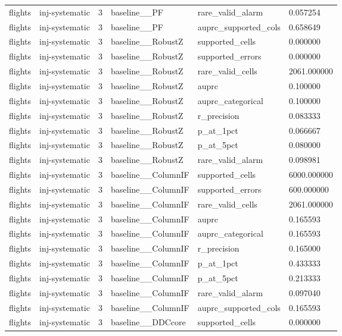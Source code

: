 \begin{tabular}{llllll}
flights & inj-systematic & 3 & baseline\_\_PF & rare\_valid\_alarm & 0.057254 \\
flights & inj-systematic & 3 & baseline\_\_PF & auprc\_supported\_cols & 0.658649 \\
flights & inj-systematic & 3 & baseline\_\_RobustZ & supported\_cells & 0.000000 \\
flights & inj-systematic & 3 & baseline\_\_RobustZ & supported\_errors & 0.000000 \\
flights & inj-systematic & 3 & baseline\_\_RobustZ & rare\_valid\_cells & 2061.000000 \\
flights & inj-systematic & 3 & baseline\_\_RobustZ & auprc & 0.100000 \\
flights & inj-systematic & 3 & baseline\_\_RobustZ & auprc\_categorical & 0.100000 \\
flights & inj-systematic & 3 & baseline\_\_RobustZ & r\_precision & 0.083333 \\
flights & inj-systematic & 3 & baseline\_\_RobustZ & p\_at\_1pct & 0.066667 \\
flights & inj-systematic & 3 & baseline\_\_RobustZ & p\_at\_5pct & 0.080000 \\
flights & inj-systematic & 3 & baseline\_\_RobustZ & rare\_valid\_alarm & 0.098981 \\
flights & inj-systematic & 3 & baseline\_\_ColumnIF & supported\_cells & 6000.000000 \\
flights & inj-systematic & 3 & baseline\_\_ColumnIF & supported\_errors & 600.000000 \\
flights & inj-systematic & 3 & baseline\_\_ColumnIF & rare\_valid\_cells & 2061.000000 \\
flights & inj-systematic & 3 & baseline\_\_ColumnIF & auprc & 0.165593 \\
flights & inj-systematic & 3 & baseline\_\_ColumnIF & auprc\_categorical & 0.165593 \\
flights & inj-systematic & 3 & baseline\_\_ColumnIF & r\_precision & 0.165000 \\
flights & inj-systematic & 3 & baseline\_\_ColumnIF & p\_at\_1pct & 0.433333 \\
flights & inj-systematic & 3 & baseline\_\_ColumnIF & p\_at\_5pct & 0.213333 \\
flights & inj-systematic & 3 & baseline\_\_ColumnIF & rare\_valid\_alarm & 0.097040 \\
flights & inj-systematic & 3 & baseline\_\_ColumnIF & auprc\_supported\_cols & 0.165593 \\
flights & inj-systematic & 3 & baseline\_\_DDCcore & supported\_cells & 0.000000 \\

\end{tabular}
